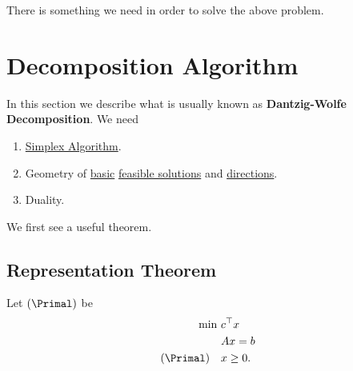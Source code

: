 There is something we need in order to solve the above problem.

\section{Decomposition Algorithm}
In this section we describe what is usually known as \textbf{Dantzig-Wolfe Decomposition}. We need
\begin{enumerate}
	\item \hyperref[algo:simplex-algorithm]{Simplex Algorithm}.
	\item Geometry of \hyperref[def:basic-solution]{basic} \hyperref[def:feasible-solution]{feasible solutions} and \hyperref[def:basic-direction]{directions}.
	\item Duality.
\end{enumerate}

We first see a useful theorem.
\subsection{Representation Theorem}
Let \((\Primal)\) be
\[
	\begin{aligned}
		\min~          & c^{\top}x \\
		               & Ax = b    \\
		(\Primal)\quad & x\geq 0.
	\end{aligned}
\]

